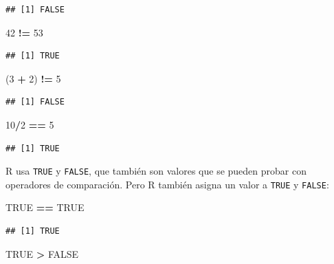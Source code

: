 \documentclass[
]{book}
\newenvironment{Shaded}{\begin{snugshade}}{\end{snugshade}}
\newcommand{\DecValTok}[1]{\textcolor[rgb]{0.00,0.00,0.81}{#1}}
\newcommand{\NormalTok}[1]{#1}
\newcommand{\OperatorTok}[1]{\textcolor[rgb]{0.81,0.36,0.00}{\textbf{#1}}}
\newcommand{\OtherTok}[1]{\textcolor[rgb]{0.56,0.35,0.01}{#1}}
\newcommand{\StringTok}[1]{\textcolor[rgb]{0.31,0.60,0.02}{#1}}
\begin{document}
\begin{verbatim}
## [1] FALSE
\end{verbatim}

\begin{Shaded}
\begin{Highlighting}[]
\DecValTok{42} \OperatorTok{!=}\StringTok{ }\DecValTok{53}
\end{Highlighting}
\end{Shaded}

\begin{verbatim}
## [1] TRUE
\end{verbatim}

\begin{Shaded}
\begin{Highlighting}[]
\NormalTok{(}\DecValTok{3} \OperatorTok{+}\StringTok{ }\DecValTok{2}\NormalTok{) }\OperatorTok{!=}\StringTok{ }\DecValTok{5}
\end{Highlighting}
\end{Shaded}

\begin{verbatim}
## [1] FALSE
\end{verbatim}

\begin{Shaded}
\begin{Highlighting}[]
\DecValTok{10}\OperatorTok{/}\DecValTok{2} \OperatorTok{==}\StringTok{ }\DecValTok{5}
\end{Highlighting}
\end{Shaded}

\begin{verbatim}
## [1] TRUE
\end{verbatim}

R usa \texttt{TRUE} y \texttt{FALSE}, que también son valores que se pueden probar con operadores de comparación. Pero R también asigna un valor a \texttt{TRUE} y \texttt{FALSE}:

\begin{Shaded}
\begin{Highlighting}[]
\OtherTok{TRUE} \OperatorTok{==}\StringTok{ }\OtherTok{TRUE}
\end{Highlighting}
\end{Shaded}

\begin{verbatim}
## [1] TRUE
\end{verbatim}

\begin{Shaded}
\begin{Highlighting}[]
\OtherTok{TRUE} \OperatorTok{>}\StringTok{ }\OtherTok{FALSE}
\end{Highlighting}
\end{Shaded}
\end{document}
